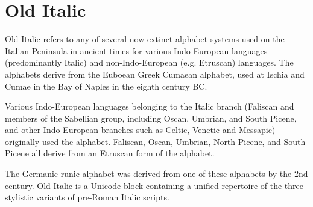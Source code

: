 \section{Old Italic}
\label{s:olditalic}

\newfontfamily{}

Old Italic refers to any of several now extinct alphabet systems used on the Italian Peninsula in ancient times for various Indo-European languages (predominantly Italic) and non-Indo-European (e.g. Etruscan) languages. The alphabets derive from the Euboean Greek Cumaean alphabet, used at Ischia and Cumae in the Bay of Naples in the eighth century BC.

Various Indo-European languages belonging to the Italic branch (Faliscan and members of the Sabellian group, including Oscan, Umbrian, and South Picene, and other Indo-European branches such as Celtic, Venetic and Messapic) originally used the alphabet. Faliscan, Oscan, Umbrian, North Picene, and South Picene all derive from an Etruscan form of the alphabet.

The Germanic runic alphabet was derived from one of these alphabets by the 2nd century.
Old Italic is a Unicode block containing a unified repertoire of the three stylistic variants of pre-Roman Italic scripts.

\begin{scriptexample}[]{}
\end{scriptexample}